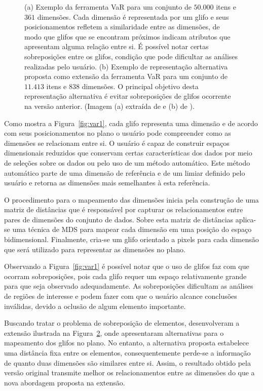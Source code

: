 \begin{figure}[h!]
\begin{subfigure}[b]{0.475\textwidth}
    \caption{}
    \label{fig:var2}
  \end{subfigure}
  \caption[VaR: Value and Relation]
      {(a) Exemplo da ferramenta VaR para um conjunto de
      $50.000$ itens e $361$ dimensões.  Cada dimensão é
      representada por um glifo e seus posicionamentos
      refletem a similaridade entre as dimensões, de
      modo que glifos que se encontram próximos indicam
      atributos que apresentam alguma relação entre si.
      É possível notar certas sobreposições entre os
      glifos, condição que pode dificultar as análises
      realizadas pelo usuário. (b) Exemplo de
      representação alternativa proposta como extensão
      da ferramenta VaR para um conjunto de $11.413$ itens e
      $838$ dimensões. O principal objetivo desta
      representação alternativa é evitar sobreposições
      de glifos ocorrente na versão anterior.
      (Imagem (a) extraída de \cite{Yang2004} e (b)
      de \cite{Yang2007}).}
\end{figure}

Como mostra a Figura~\ref{fig:var1}, cada glifo representa
uma dimensão e de acordo com seus posicionamentos no plano o
usuário pode compreender como as dimensões se relacionam
entre si.  O usuário é capaz de construir espaços
dimensionais reduzidos que conservam certas características
dos dados por meio de seleções sobre os dados ou pelo uso de
um método automático. Este método automático parte de uma
dimensão de referência e de um limiar definido pelo usuário
e retorna as dimensões mais semelhantes à esta referência.

O procedimento para o mapeamento das dimensões inicia
pela construção de uma matriz de distâncias que é
responsável por capturar os relacionamentos entre pares de
dimensões do conjunto de dados.  Sobre esta matriz de
distâncias aplica-se uma técnica de MDS para mapear cada
dimensão em uma posição do espaço bidimensional.
Finalmente, cria-se um glifo orientado a pixels para cada
dimensão que será utilizado para representar as dimensões
no plano.

Observando a Figura~\ref{fig:var1} é possível notar que o
uso de glifos faz com que ocorram sobreposições, pois cada
glifo requer um espaço relativamente grande para que seja
observado adequadamente.  As sobreposições dificultam as
análises de regiões de interesse e podem fazer com que o
usuário alcance conclusões inválidas, devido a oclusão de
algum elemento importante.  

Buscando tratar o problema de sobreposição de elementos,
\cite{Yang2007} desenvolveram a extensão ilustrada na
Figura~\ref{fig:var2}, onde apresentaram alternativas para o
mapeamento dos glifos no plano. No entanto, a alternativa
proposta estabelece uma distância fixa entre os elementos,
consequentemente perde-se a informação de quanto duas
dimensões são similares entre si. Assim, o resultado obtido
pela versão original transmite melhor os relacionamentos entre
as dimensões do que a nova abordagem proposta na extensão. 

